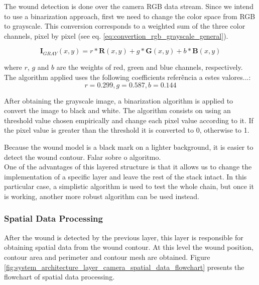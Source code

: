 The wound detection is done over the camera RGB data stream. Since we intend to use a binarization approach, first we need to change the color space from RGB to grayscale. This conversion corresponds to a weighted sum of the three color channels, pixel by pixel (see eq. \ref{eq:convertion_rgb_grayscale_general}).

\begin{equation}
\boldsymbol{I}_{GRAY}(x,y) = r * \boldsymbol{R}(x,y) + g * \boldsymbol{G}(x,y) + b * \boldsymbol{B}(x,y)
\label{eq:convertion_rgb_grayscale_general}
\end{equation}

where $r$, $g$ and $b$ are the weights of red, green and blue channels, respectively. The algorithm applied uses the following coefficients {\color{red} referência a estes valores...}: 
$$ r = 0.299, g = 0.587, b = 0.144 $$

After obtaining the grayscale image, a binarization algorithm is applied to convert the image to black and white. The algorithm consists on using an threshold value chosen empirically and change each pixel value according to it. If the pixel value is greater than the threshold it is converted to 0, otherwise to 1.  

Because the wound model is a black mark on a lighter background, it is easier to detect the wound contour. {\color{red} Falar sobre o algoritmo.}\\

One of the advantages of this layered structure is that it allows us to change the implementation of a specific layer and leave the rest of the stack intact. In this particular case, a simplistic algorithm is used to test the whole chain, but once it is working, another more robust algorithm can be used instead.


\subsubsection*{Spatial Data Processing}
\label{subsubsec:system_architectural_camera_layers_spatial_data}

After the wound is detected by the previous layer, this layer is responsible for obtaining spatial data from the wound contour. At this level the wound position, contour area and perimeter and contour mesh are obtained. Figure \ref{fig:system_architecture_layer_camera_spatial_data_flowchart} presents the flowchart of spatial data processing.

